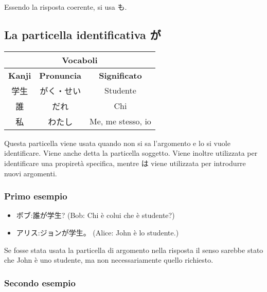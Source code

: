 \documentclass{article}
\let\ita\textitalian
\let\jap\textjapanese
\newcommand{\itabf}[1]{\ita{\textbf{#1}}}
\newenvironment{tabVoc}{\begin{center}\begin{japanese}\begin{longtable}{|c|c|c|}}{\end{longtable}\end{japanese}\end{center}}
\begin{document}
                Essendo la risposta coerente, si usa \jap{も}.

        \subsection{La particella identificativa \jap{が}}

            \begin{tabVoc}
                \hline
                \multicolumn{3}{|c|}{\itabf{Vocaboli}}\\
                \hline
                \itabf{Kanji} & \itabf{Pronuncia} & \itabf{Significato}\\
                \hline\hline
                学生 & がく・せい & \ita{Studente}\\
                \hline
                誰 & だれ & \ita{Chi}\\
                \hline
                私 & わたし & \ita{Me, me stesso, io}\\
                \hline
            \end{tabVoc}

            Questa particella viene usata quando non si sa l'argomento e lo si vuole identificare. Viene anche detta la particella
            soggetto. Viene inoltre utilizzata per identificare una propiretà specifica, mentre \jap{は} viene utilizzata per introdurre nuovi
            argomenti.

            \subsubsection*{Primo esempio}

                \begin{itemize}
                    \item \jap{ボブ:誰が学生?} (Bob: Chi è colui che è studente?)
                    \item \jap{アリス:ジョンが学生。} (Alice: John è lo studente.)
                \end{itemize}

                Se fosse stata usata la particella di argomento nella risposta il senso sarebbe stato che John è uno studente, ma non
                necessariamente quello richiesto.

            \subsubsection*{Secondo esempio}
\end{document}
